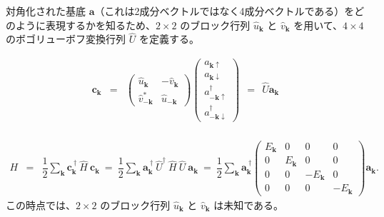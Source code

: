 \documentclass[uplatex,a4j,12pt,dvipdfmx]{jsarticle}
\begin{document}
対角化された基底 $\bm{a}$（これは2成分ベクトルではなく4成分ベクトルである）をどのように表現するかを知るため、$2 \times 2$ のブロック行列 $\hat{u}_{\bm{k}}$ と $\hat{v}_{\bm{k}}$ を用いて、$4 \times 4$ のボゴリューボフ変換行列 $\hat{U}$ を定義する。

\begin{eqnarray}
	\bm{c}_{\bm{k}}
	&=&
	\left(
	\begin{array}{cc}
			\hat{u}_{\bm{k}}       & - \hat{v}_{\bm{k}} \\[3mm]
			\hat{v}_{- \bm{k}}^{*} & \hat{u}_{- \bm{k}}
		\end{array}
	\right)
	\!\!\!
	\left(
	\begin{array}{c}
			a_{\bm{k} \uparrow}            \\[2mm]
			a_{\bm{k} \downarrow}          \\[2mm]
			a^{\dagger}_{-\bm{k} \uparrow} \\[2mm]
			a^{\dagger}_{-\bm{k} \downarrow}
		\end{array}
	\right)
	\ \ = \ \
	\hat{U}
	\bm{a}_{\bm{k}}
\end{eqnarray}
%
\ \\[-10mm]

\begin{eqnarray}
	H
	&=&
	\dfrac{1}{2}
	\sum_{\bm{k}}
	\bm{c}^{\ \dagger}_{\bm{k}}
	\
	\hat{H}
	\
	\bm{c}_{\bm{k}}
	\ = \
	\dfrac{1}{2}
	\sum_{\bm{k}}
	\bm{a}^{\ \dagger}_{\bm{k}}
	\
	\hat{U}^{\dagger}
	\
	\hat{H}
	\
	\hat{U}
	\
	\bm{a}_{\bm{k}}
	\ = \
	\dfrac{1}{2}
	\sum_{\bm{k}}
	\bm{a}^{\ \dagger}_{\bm{k}}
	\left(
	\begin{array}{cccc}
			E_{\bm{k}} & 0           & 0             & 0
			\\[3mm]
			0           & E_{\bm{k}} & 0             & 0
			\\[3mm]
			0           & 0           & - E_{\bm{k}} & 0
			\\[3mm]
			0           & 0           & 0             & - E_{\bm{k}}
		\end{array}
	\right)
	\bm{a}_{\bm{k}}
	.
\end{eqnarray}
%
この時点では、$2 \times 2$ のブロック行列 $\hat{u}_{\bm{k}}$ と $\hat{v}_{\bm{k}}$ は未知である。
\end{document}
